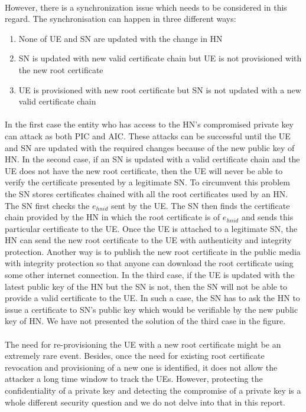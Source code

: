 \documentclass[lnicst,sechang,a4paper]{svmultln}
\begin{document}
\paragraph{}
However, there is a synchronization issue which needs to be considered in this regard. The synchronisation can happen in three different ways: 
\begin{enumerate}
\item None of UE and SN are updated with the change in HN
\item SN is updated with new valid certificate chain but UE is not provisioned with the new root certificate
\item UE is provisioned with new root certificate but SN is not updated with a new valid certificate chain
\end{enumerate} 
\paragraph{}
In the first case the entity who has access to the HN's compromised private key can attack as both PIC and AIC. These attacks can be successful until the UE and SN are updated with the required changes because of the new public key of HN. In the second case, if an SN is updated with a valid certificate chain and the UE does not have the new root certificate, then the UE will never be able to verify the certificate presented by a legitimate SN. To circumvent this problem the SN stores certificates chained with all the root certificates used by an HN. The SN first checks the $e_{hnid}$ sent by the UE. The SN then finds the certificate chain provided by the HN in which the root certificate is of $e_{hnid}$ and sends this particular certificate to the UE. Once the UE is attached to a legitimate SN, the HN can send the new root certificate to the UE with authenticity and integrity protection. Another way is to publish the new root certificate in the public media with integrity protection so that anyone can download the root certificate using some other internet connection. In the third case, if the UE is updated with the latest public key of the HN but the SN is not, then the SN will not be able to provide a valid certificate to the UE. In such a case, the SN has to ask the HN to issue a certificate to SN's public key which would be verifiable by the new public key of HN. We have not presented the solution of the third case in the figure.
\paragraph{}
The need for re-provisioning the UE with a new root certificate might be an extremely rare event. Besides, once the need for existing root certificate revocation and provisioning of a new one is identified, it does not allow the attacker a long time window to track the UEs. However, protecting the confidentiality of a private key and detecting the compromise of a private key is a whole different security question and we do not delve into that in this report.
\end{document}
